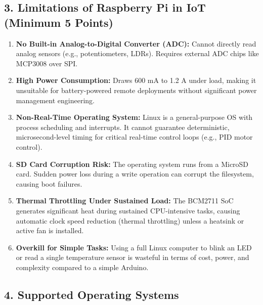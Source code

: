 \subsection{3. Limitations of Raspberry Pi in IoT (Minimum 5 Points)}
\begin{enumerate}
  \item \textbf{No Built-in Analog-to-Digital Converter (ADC):} Cannot directly read analog sensors (e.g., potentiometers, LDRs). Requires external ADC chips like MCP3008 over SPI.
  \item \textbf{High Power Consumption:} Draws 600 mA to 1.2 A under load, making it unsuitable for battery-powered remote deployments without significant power management engineering.
  \item \textbf{Non-Real-Time Operating System:} Linux is a general-purpose OS with process scheduling and interrupts. It cannot guarantee deterministic, microsecond-level timing for critical real-time control loops (e.g., PID motor control).
  \item \textbf{SD Card Corruption Risk:} The operating system runs from a MicroSD card. Sudden power loss during a write operation can corrupt the filesystem, causing boot failures.
  \item \textbf{Thermal Throttling Under Sustained Load:} The BCM2711 SoC generates significant heat during sustained CPU-intensive tasks, causing automatic clock speed reduction (thermal throttling) unless a heatsink or active fan is installed.
  \item \textbf{Overkill for Simple Tasks:} Using a full Linux computer to blink an LED or read a single temperature sensor is wasteful in terms of cost, power, and complexity compared to a simple Arduino.
\end{enumerate}


\subsection{4. Supported Operating Systems}

